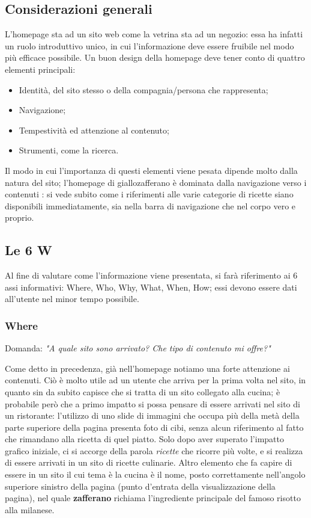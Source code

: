 \subsection{Considerazioni generali}
L'homepage sta ad un sito web come la vetrina sta ad un negozio: essa ha infatti un ruolo introduttivo unico, in cui l'informazione deve essere fruibile nel modo più efficace possibile. Un buon design della homepage deve tener conto di quattro elementi principali:
\begin{itemize}
	\item Identità, del sito stesso o della compagnia/persona che rappresenta;
	\item Navigazione;
	\item Tempestività ed attenzione al contenuto;
	\item Strumenti, come la ricerca.
\end{itemize}
Il modo in cui l'importanza di questi elementi viene pesata dipende molto dalla natura del sito; l'homepage di giallozafferano è dominata dalla navigazione verso i contenuti : si vede subito come i riferimenti alle varie categorie di ricette siano disponibili immediatamente, sia nella barra di navigazione che nel corpo vero e proprio.

\subsection{Le 6 W}
Al fine di valutare come l'informazione viene presentata, si farà riferimento ai 6 assi informativi: Where, Who, Why, What, When, How; essi devono essere dati all'utente nel minor tempo possibile.

\subsubsection{Where} 

Domanda: \textit{"A quale sito sono arrivato? Che tipo di contenuto mi offre?"}

Come detto in precedenza, già nell'homepage notiamo una forte attenzione ai contenuti. Ciò è molto utile ad un utente che arriva per la prima volta nel sito, in quanto sin da subito capisce che si tratta di un sito collegato alla cucina; è probabile però che a primo impatto si possa pensare di essere arrivati nel sito di un ristorante: l'utilizzo di uno slide di immagini che occupa più della metà della parte superiore della pagina presenta foto di cibi, senza alcun riferimento al fatto che rimandano alla ricetta di quel piatto. Solo dopo aver superato l'impatto grafico iniziale, ci si accorge della parola \textit{ricette} che ricorre più volte, e si realizza di essere arrivati in un sito di ricette culinarie. 
Altro elemento che fa capire di essere in un sito il cui tema è la cucina è il nome, posto correttamente nell'angolo superiore sinistro della pagina (punto d'entrata della visualizzazione della pagina), nel quale \textbf{zafferano} richiama l'ingrediente principale del famoso risotto alla milanese.

